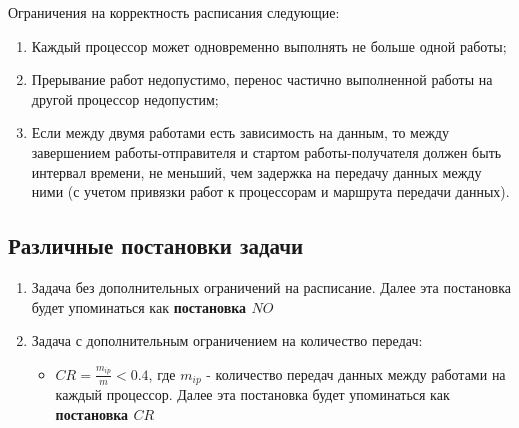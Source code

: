 Ограничения на корректность расписания следующие:
\begin{enumerate}
    \item Каждый процессор может одновременно выполнять не больше одной работы;
    \item Прерывание работ недопустимо, перенос частично выполненной работы на другой процессор недопустим;
    \item Если между двумя работами есть зависимость на данным, то между завершением работы-отправителя и стартом работы-получателя должен быть интервал времени, не меньший, чем задержка на передачу данных между ними (с учетом привязки работ к процессорам и маршрута передачи данных).
\end{enumerate}
\subsection{Различные постановки задачи} \label{sec:crit}
\begin{enumerate}
    \item Задача без дополнительных ограничений на расписание. Далее эта постановка будет упоминаться как \textbf{постановка $NO$}
    \item Задача с дополнительным ограничением на количество передач:
          \begin{itemize}
              \item $CR = \frac{m_{ip}}{m} < 0.4$, где $m_{ip}$ - количество передач данных между работами на каждый процессор. Далее эта постановка будет упоминаться как \textbf{постановка $CR$}
          \end{itemize}
\end{enumerate}